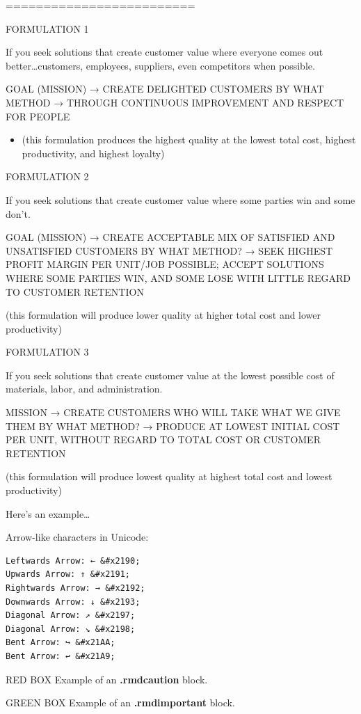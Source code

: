 \documentclass[
]{book}
\providecommand{\tightlist}{%
  \setlength{\itemsep}{0pt}\setlength{\parskip}{0pt}}
\begin{document}
=========================

FORMULATION 1

If you seek solutions that create customer value where everyone comes out better\ldots customers, employees, suppliers, even competitors when possible.

GOAL (MISSION) → CREATE DELIGHTED CUSTOMERS
BY WHAT METHOD → THROUGH CONTINUOUS IMPROVEMENT AND RESPECT FOR PEOPLE

\begin{itemize}
\tightlist
\item
  (this formulation produces the highest quality at the lowest total cost, highest productivity, and highest loyalty)
\end{itemize}

FORMULATION 2

If you seek solutions that create customer value where some parties win and some don't.

GOAL (MISSION) → CREATE ACCEPTABLE MIX OF SATISFIED AND UNSATISFIED CUSTOMERS
BY WHAT METHOD? → SEEK HIGHEST PROFIT MARGIN PER UNIT/JOB POSSIBLE; ACCEPT SOLUTIONS WHERE SOME PARTIES WIN, AND SOME LOSE WITH LITTLE REGARD TO CUSTOMER RETENTION

(this formulation will produce lower quality at higher total cost and lower productivity)

FORMULATION 3

If you seek solutions that create customer value at the lowest possible cost of materials, labor, and administration.

MISSION → CREATE CUSTOMERS WHO WILL TAKE WHAT WE GIVE THEM
BY WHAT METHOD? → PRODUCE AT LOWEST INITIAL COST PER UNIT, WITHOUT REGARD TO TOTAL COST OR CUSTOMER RETENTION

(this formulation will produce lowest quality at highest total cost and lowest productivity)

Here's an example\ldots{}

Arrow-like characters in Unicode:

\begin{verbatim}
Leftwards Arrow: ← &#x2190;
Upwards Arrow: ↑ &#x2191;
Rightwards Arrow: → &#x2192;
Downwards Arrow: ↓ &#x2193;
Diagonal Arrow: ↗ &#x2197;
Diagonal Arrow: ↘ &#x2198;
Bent Arrow: ↪ &#x21AA;
Bent Arrow: ↩ &#x21A9;
\end{verbatim}

RED BOX Example of an \textbf{.rmdcaution} block.

GREEN BOX Example of an \textbf{.rmdimportant} block.
\end{document}
